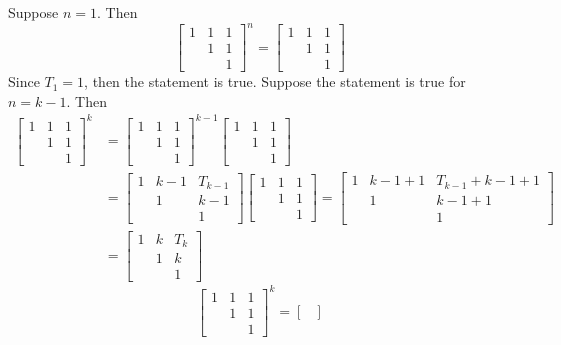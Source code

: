 \begin{description}
Suppose $n = 1$. Then
$$\begin{bmatrix}
1 & 1 & 1 \\
& 1 & 1 \\
& & 1
\end{bmatrix}^n = \begin{bmatrix}
1 & 1 & 1 \\
& 1 & 1 \\
& & 1
\end{bmatrix}$$
Since $T_1 = 1$, then the statement is true. Suppose the statement is true for $n = k - 1$. Then
\begin{align*}
\begin{bmatrix}
1 & 1 & 1 \\
& 1 & 1 \\
& & 1
\end{bmatrix}^k & = \begin{bmatrix}
1 & 1 & 1 \\
& 1 & 1 \\
& & 1
\end{bmatrix}^{k-1}\begin{bmatrix}
1 & 1 & 1 \\
& 1 & 1 \\
& & 1
\end{bmatrix}		\\
&= \begin{bmatrix}
1 & k-1 & T_{k-1} \\
& 1 & k-1 \\
& & 1
\end{bmatrix}\begin{bmatrix}
1 & 1 & 1 \\
& 1 & 1 \\
& & 1
\end{bmatrix} = \begin{bmatrix}
1 & k-1 + 1 & T_{k-1} + k-1 + 1 \\
& 1 & k -1 + 1 \\
& & 1 
\end{bmatrix}\\
& = \begin{bmatrix}
1 & k & T_k \\
& 1 & k \\
& & 1
\end{bmatrix}
\end{align*}
$$\begin{bmatrix}
1 & 1 & 1 \\
& 1 & 1 \\
& & 1
\end{bmatrix}^k = \begin{bmatrix}

\end{bmatrix}$$
\end{description}
